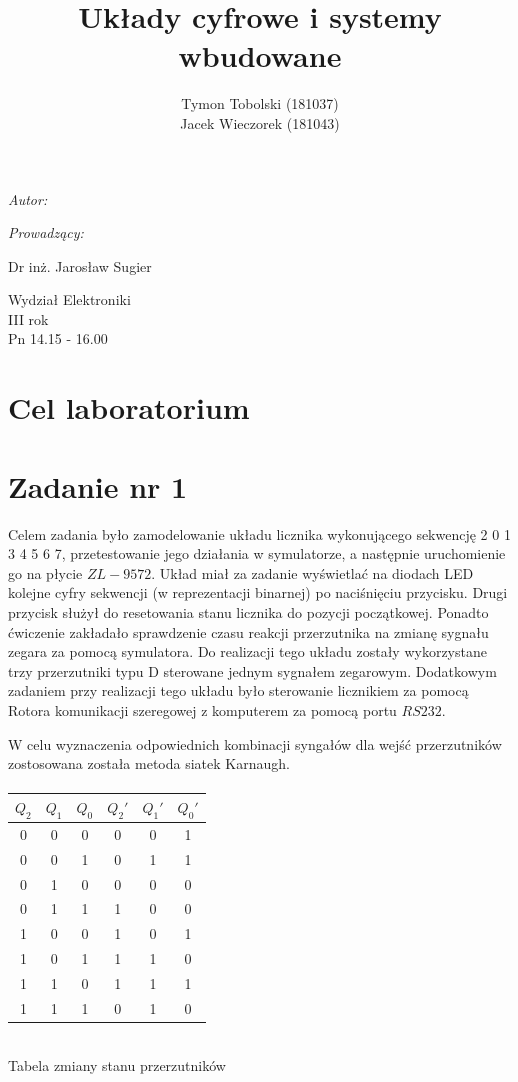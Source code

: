 \documentclass[wide,a4paper,titlepage,12pt] {article}
\title{Układy cyfrowe i systemy wbudowane}
\author{Tymon Tobolski (181037)\\ Jacek Wieczorek (181043)}
\makeatletter
\renewcommand{\maketitle}{
\begin{titlepage}
  \begin{center}
    \vspace*{3cm}
    \LARGE \@title \par
    \vspace{2cm}
    \textit{\small Autor:}\par
    \normalsize \@author\par \normalsize
    \vspace{3cm}
    \textit{\small Prowadzący:}\par
    Dr inż. Jarosław Sugier \par
    \vspace{2cm}
    Wydział Elektroniki\\ III rok\\ Pn 14.15 - 16.00\par
    \vspace{4cm}
    \small \@date
  \end{center}
\end{titlepage}
}
\makeatother
\begin{document}
\maketitle
  \section{Cel laboratorium}

  \section{Zadanie nr 1}
  Celem zadania było zamodelowanie układu licznika wykonującego sekwencję 2 0 1 3 4 5 6 7, przetestowanie jego działania w symulatorze, a następnie uruchomienie go na płycie $ZL-9572$. Układ miał za zadanie wyświetlać na diodach LED kolejne cyfry sekwencji (w reprezentacji binarnej) po naciśnięciu przycisku. Drugi przycisk służył do resetowania stanu licznika do pozycji początkowej. Ponadto ćwiczenie zakładało sprawdzenie czasu reakcji przerzutnika na zmianę sygnału zegara za pomocą symulatora. Do realizacji tego układu zostały wykorzystane trzy przerzutniki typu D sterowane jednym sygnałem zegarowym. Dodatkowym zadaniem przy realizacji tego układu było sterowanie licznikiem za pomocą Rotora komunikacji szeregowej z komputerem za pomocą portu $RS232$.

  W celu wyznaczenia odpowiednich kombinacji syngałów dla wejść przerzutników zostosowana została metoda siatek Karnaugh.

  \paragraph{}

	  \begin{center}

	  \begin{tabular}{|c|c|c||c|c|c|}
			\hline
			$Q_{2}$ & $Q_{1}$ & $Q_{0}$ & $Q_{2}'$ & $Q_{1}'$ & $Q_{0}'$ \\
			\hline
      0 & 0 & 0 & 0 & 0 & 1 \\
      0 & 0 & 1 & 0 & 1 & 1 \\
      0 & 1 & 0 & 0 & 0 & 0 \\
      0 & 1 & 1 & 1 & 0 & 0 \\
      1 & 0 & 0 & 1 & 0 & 1 \\
      1 & 0 & 1 & 1 & 1 & 0 \\
      1 & 1 & 0 & 1 & 1 & 1 \\
      1 & 1 & 1 & 0 & 1 & 0 \\
      \hline
	  \end{tabular}
	 \\ Tabela zmiany stanu przerzutników
	  \end{center}
\end{document}
